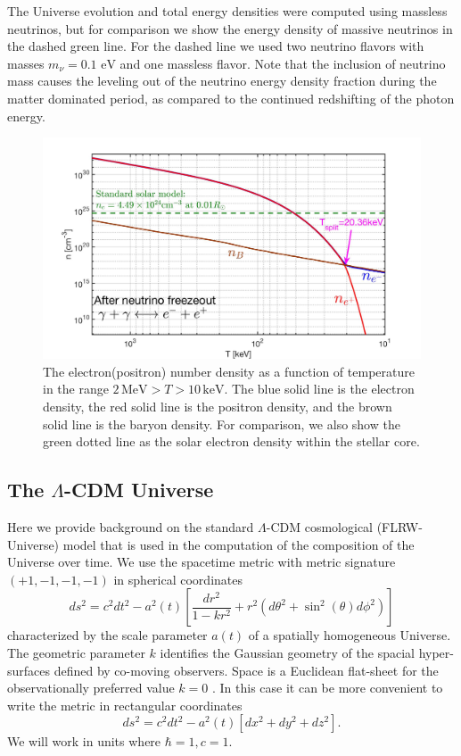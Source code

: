 \documentclass[universe,article,submit,moreauthors,pdftex,a4paper]{Definitions/mdpi}
\newcommand{\eV}{\text{ eV}}
\newcommand{\beqn}{\begin{equation}}
\newcommand{\eeqn}{\end{equation}}
\begin{document}
The Universe evolution and total energy densities were computed using massless neutrinos, but  for comparison we show the energy density of massive neutrinos in the dashed green line. For the dashed line we used two neutrino flavors with masses $m_\nu=0.1\eV$ and one massless flavor.  Note that the inclusion of neutrino mass causes the leveling out of the neutrino energy density fraction during the matter dominated period, as compared to the continued redshifting of the photon energy.

\begin{figure}[h]
  \centering
  \includegraphics[width=\linewidth]{./plots/NewDensity_cm3.jpg}
  \caption{The electron(positron) number density as a function of temperature in the range $2\,\mathrm{MeV}>T>10\,\mathrm{keV}$. The blue solid line is the electron density, the red solid line is the positron density, and the brown solid line is the baryon density. For comparison, we also show the green dotted line as the solar electron density within the stellar core.}
  \label{Density_fig} 
\end{figure}

\subsection{The $\Lambda$-CDM Universe}\label{sec:Cosmo}
\noindent Here we provide background on the standard $\Lambda$-CDM cosmological (FLRW-Universe) model that is used in the computation of the composition of the Universe over time. We use the spacetime metric with metric signature $(+1,-1,-1,-1)$ in spherical coordinates
\beqn\label{metric}
ds^2=c^2dt^2-a^2(t)\left[ \frac{dr^2}{1-kr^2}+r^2(d\theta^2+\sin^2(\theta)d\phi^2)\right]
\eeqn
characterized  by the scale parameter $a(t)$  of a spatially homogeneous  Universe. The geometric parameter $k$ identifies the Gaussian geometry of the spacial hyper-surfaces defined by co-moving observers. Space is a Euclidean flat-sheet for the observationally preferred value $k=0$ \cite{Planck:2013pxb,Planck:2015fie,Planck:2018vyg}. In this case it can be more convenient to write the metric in rectangular coordinates
\beqn\label{metric2}
ds^2=c^2dt^2-a^2(t)\left[ dx^2+dy^2+dz^2\right].
\eeqn
We will work in units where $\hbar=1,c=1$.
\end{document}
